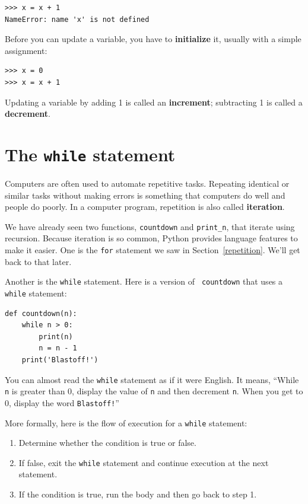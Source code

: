 \documentclass[10pt]{book}
\begin{document}
\begin{verbatim}
>>> x = x + 1
NameError: name 'x' is not defined
\end{verbatim}
%
Before you can update a variable, you have to {\bf initialize}
it, usually with a simple assignment:

\begin{verbatim}
>>> x = 0
>>> x = x + 1
\end{verbatim}
%
Updating a variable by adding 1 is called an {\bf increment};
subtracting 1 is called a {\bf decrement}.




\section{The {\tt while} statement}

Computers are often used to automate repetitive tasks.  Repeating
identical or similar tasks without making errors is something that
computers do well and people do poorly.  In a computer program,
repetition is also called {\bf iteration}.

We have already seen two functions, {\tt countdown} and
\verb"print_n", that iterate using recursion.  Because iteration is so
common, Python provides language features to make it easier.
One is the {\tt for} statement we saw in Section~\ref{repetition}.
We'll get back to that later.

Another is the {\tt while} statement.  Here is a version of {\tt
countdown} that uses a {\tt while} statement:

\begin{verbatim}
def countdown(n):
    while n > 0:
        print(n)
        n = n - 1
    print('Blastoff!')
\end{verbatim}
%
You can almost read the {\tt while} statement as if it were English.
It means, ``While {\tt n} is greater than 0,
display the value of {\tt n} and then decrement
{\tt n}.  When you get to 0, display the word {\tt Blastoff!}''

More formally, here is the flow of execution for a {\tt while} statement:

\begin{enumerate}

\item Determine whether the condition is true or false.

\item If false, exit the {\tt while} statement
and continue execution at the next statement.

\item If the condition is true, run the
body and then go back to step 1.

\end{enumerate}
\end{document}
